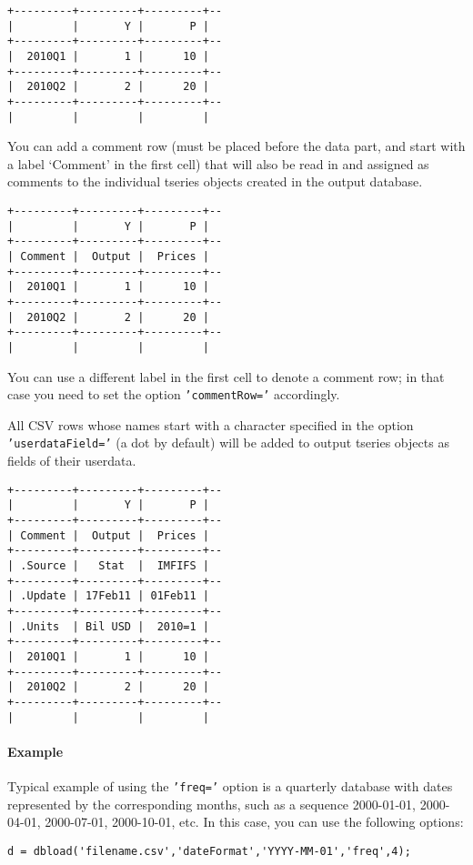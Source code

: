 \begin{verbatim}
+---------+---------+---------+--
|         |       Y |       P |
+---------+---------+---------+--
|  2010Q1 |       1 |      10 |
+---------+---------+---------+--
|  2010Q2 |       2 |      20 |
+---------+---------+---------+--
|         |         |         |
\end{verbatim}

You can add a comment row (must be placed before the data part, and
start with a label `Comment' in the first cell) that will also be read
in and assigned as comments to the individual tseries objects created in
the output database.

\begin{verbatim}
+---------+---------+---------+--
|         |       Y |       P |
+---------+---------+---------+--
| Comment |  Output |  Prices |
+---------+---------+---------+--
|  2010Q1 |       1 |      10 |
+---------+---------+---------+--
|  2010Q2 |       2 |      20 |
+---------+---------+---------+--
|         |         |         |
\end{verbatim}

You can use a different label in the first cell to denote a comment row;
in that case you need to set the option \texttt{'commentRow='}
accordingly.

All CSV rows whose names start with a character specified in the option
\texttt{'userdataField='} (a dot by default) will be added to output
tseries objects as fields of their userdata.

\begin{verbatim}
+---------+---------+---------+--
|         |       Y |       P |
+---------+---------+---------+--
| Comment |  Output |  Prices |
+---------+---------+---------+--
| .Source |   Stat  |  IMFIFS |
+---------+---------+---------+--
| .Update | 17Feb11 | 01Feb11 |
+---------+---------+---------+--
| .Units  | Bil USD |  2010=1 |
+---------+---------+---------+--
|  2010Q1 |       1 |      10 |
+---------+---------+---------+--
|  2010Q2 |       2 |      20 |
+---------+---------+---------+--
|         |         |         |
\end{verbatim}

\paragraph{Example}

Typical example of using the \texttt{'freq='} option is a quarterly
database with dates represented by the corresponding months, such as a
sequence 2000-01-01, 2000-04-01, 2000-07-01, 2000-10-01, etc. In this
case, you can use the following options:

\begin{verbatim}
d = dbload('filename.csv','dateFormat','YYYY-MM-01','freq',4);
\end{verbatim}


